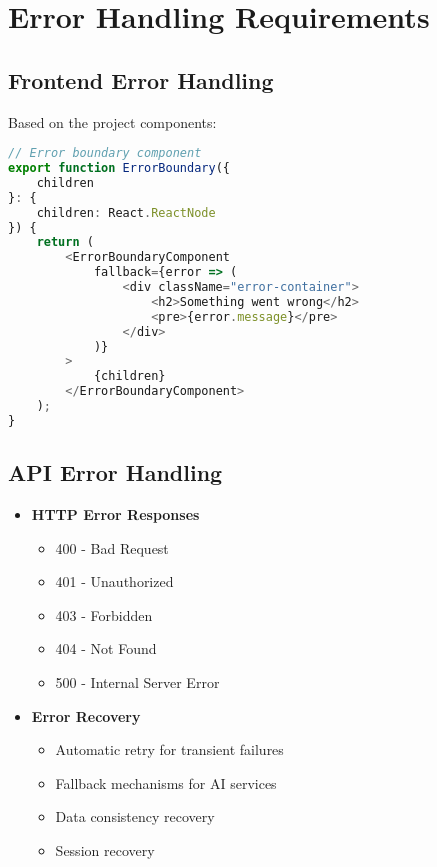 \section{Error Handling Requirements}
\subsection{Frontend Error Handling}
Based on the project components:

\begin{lstlisting}[language=typescript]
// Error boundary component
export function ErrorBoundary({ 
    children 
}: { 
    children: React.ReactNode 
}) {
    return (
        <ErrorBoundaryComponent
            fallback={error => (
                <div className="error-container">
                    <h2>Something went wrong</h2>
                    <pre>{error.message}</pre>
                </div>
            )}
        >
            {children}
        </ErrorBoundaryComponent>
    );
}
\end{lstlisting}

\subsection{API Error Handling}
\begin{itemize}
    \item \textbf{HTTP Error Responses}
    \begin{itemize}
        \item 400 - Bad Request
        \item 401 - Unauthorized
        \item 403 - Forbidden
        \item 404 - Not Found
        \item 500 - Internal Server Error
    \end{itemize}

    \item \textbf{Error Recovery}
    \begin{itemize}
        \item Automatic retry for transient failures
        \item Fallback mechanisms for AI services
        \item Data consistency recovery
        \item Session recovery
    \end{itemize}
\end{itemize} 
